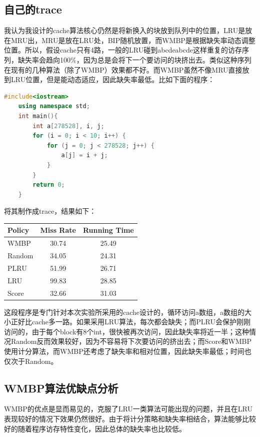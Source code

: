 \documentclass[utf8]{article}
\begin{document}
\subsection*{自己的trace}
我认为我设计的cache算法核心仍然是将新换入的块放到队列中的位置，LRU是放在MRU出，MRU是放在LRU处，BIP随机放置，而WMBP是根据缺失率动态调整位置。所以，假设cache只有4路，一般的LRU碰到abcdeabcde这样重复的访存序列，缺失率会趋向100\%，因为总是会将下一个要访问的块挤出去。类似这种序列在现有的几种算法（除了WMBP）效果都不好。而WMBP虽然不像MRU直接放到LRU位置，但是能动态适应，因此缺失率最低。比如下面的程序：
\begin{lstlisting}[language=c++]
    #include<iostream>
    using namespace std;
    int main(){
        int a[278528], i, j;
        for (i = 0; i < 10; i++) {
            for (j = 0; j < 278528; j++) { 
                a[j] = i + j;
            } 
        }
        return 0;
    }
\end{lstlisting}
将其制作成trace，结果如下：
\begin{center}
	\begin{tabular}{lcc}
        \hline  
        Policy & Miss Rate & Running Time \\  
        \hline  
        WMBP & 30.74 & 25.49 \\
        \hline
        Random & 34.05 & 24.31 \\  
        \hline  
        PLRU & 51.99 & 26.71 \\
        \hline
        LRU & 99.83 & 28.85\\
        \hline
        Score & 32.66 & 31.03\\
        \hline
	\end{tabular}
\end{center}
这段程序是专门针对本次实验所采用的cache设计的，循环访问a数组，a数组的大小正好比cache多一路。如果采用LRU算法，每次都会缺失；而PLRU会保护刚刚访问的，由于每个block有8个int，很快被再次访问，因此缺失率将近一半；这种情况Random反而效果较好，因为不容易将下次要访问的挤出去；而Score和WMBP使用计分算法，而WMBP还考虑了缺失率和相对位置，因此缺失率最低；时间也仅次于Random。

\subsection*{WMBP算法优缺点分析}
WMBP的优点是显而易见的，克服了LRU一类算法可能出现的问题，并且在LRU表现较好的情况下效果仍然很好。由于将计分策略和缺失率相结合，算法能够比较好的随着程序访存特性变化，因此总体的缺失率也比较低。
\end{document}

